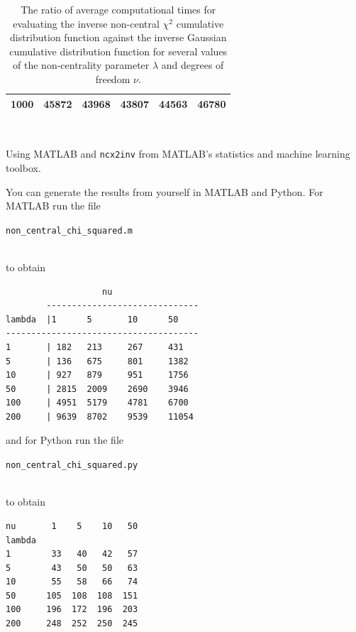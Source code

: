 \documentclass[11pt,a4paper,twoside,english]{extarticle}
\newcommand{\singlecodeline}[1]{\\[1em]\centerline{\lstinline[basicstyle=\ttfamily]$#1$}\\[1em]}
\begin{document}
\begin{table}[htb]
\begin{subtable}[t]{0.55\linewidth}
\begin{tabular}{|r|rrrrr|}
    1000& 45872 & 43968 & 43807 & 44563 & 46780  \\
    \hline
\end{tabular}\\[1em]
\begin{minipage}[t]{0.9\linewidth}
    \caption{Using MATLAB and \texttt{ncx2inv} from MATLAB's statistics and machine learning toolbox.}
    \label{tab:non_central_chi_2_times_matlab}
\end{minipage}
\end{subtable}
\hfill
\caption[Computational times for inverse non-central $ \chi^2 $ cumulative distribution]{The ratio of average computational times for evaluating the inverse non-central $ \chi^2 $ cumulative distribution function against the inverse Gaussian cumulative distribution function for several values of the non-centrality parameter $ \lambda $ and degrees of freedom $ \nu $.}
\label{tab:non_central_chi_2_times}
\end{table}

You can generate the results from  yourself in MATLAB and Python. For MATLAB run the file \singlecodeline{non_central_chi_squared.m} to obtain
\begin{verbatim}
	               nu
        ------------------------------
lambda  |1      5       10      50 	
--------------------------------------
1       | 182   213     267     431 	
5       | 136   675     801     1382 	
10      | 927   879     951     1756 	
50      | 2815  2009    2690    3946 	
100     | 4951  5179    4781    6700 	
200     | 9639  8702    9539    11054 	
\end{verbatim} 
and for Python run the file \singlecodeline{non_central_chi_squared.py} to obtain
\begin{verbatim}
nu       1    5    10   50
lambda                    
1        33   40   42   57
5        43   50   50   63
10       55   58   66   74
50      105  108  108  151
100     196  172  196  203
200     248  252  250  245
\end{verbatim}
\end{document}
